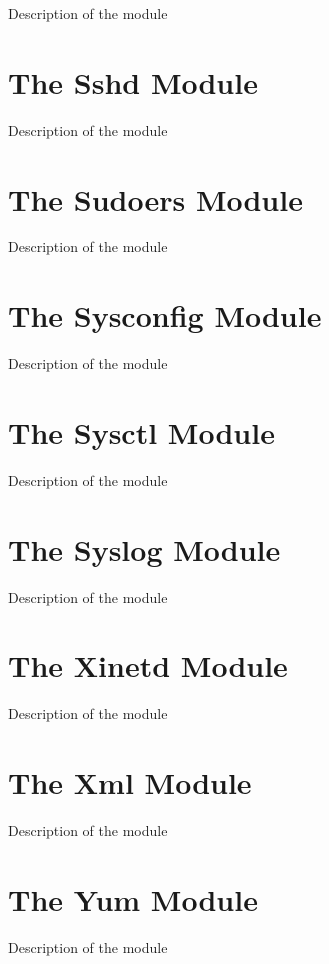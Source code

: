 Description of the module

\section{The Sshd Module}

Description of the module

\section{The Sudoers Module}

Description of the module

\section{The Sysconfig Module}

Description of the module

\section{The Sysctl Module}

Description of the module

\section{The Syslog Module}

Description of the module

\section{The Xinetd Module}

Description of the module

\section{The Xml Module}

Description of the module

\section{The Yum Module}

Description of the module


